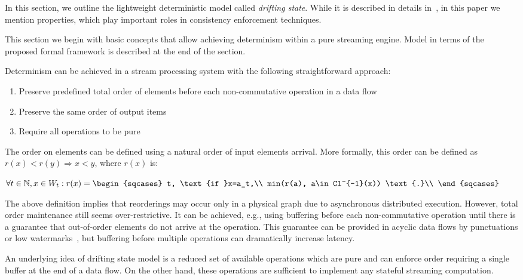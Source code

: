 
\label {fs-model-section}

In this section, we outline the lightweight deterministic model called {\em drifting state}. While it is described in details in~\cite{we2018adbis}, in this paper we mention properties, which play important roles in consistency enforcement techniques.

This section we begin with basic concepts that allow achieving determinism within a pure streaming engine. Model in terms of the proposed formal framework is described at the end of the section.

Determinism can be achieved in a stream processing system with the following straightforward approach:
\begin{enumerate}
    \item Preserve predefined total order of elements before each non-commutative operation in a data flow
    \item Preserve the same order of output items
    \item Require all operations to be pure
\end{enumerate}

The order on elements can be defined using a natural order of input elements arrival. More formally, this order can be defined as $r(x) < r(y) \Rightarrow x < y$, where $r(x)$ is:

$\forall{t\in{\mathbb{N}}, x\in{W_t}} : r(x)=\begin{sqcases}
t, \text{if }x=a_t,\\
min(r(a), a\in Cl^{-1}(x)) \text{.}\\
\end{sqcases}$

The above definition implies that reorderings may occur only in a physical graph due to asynchronous distributed execution. However, total order maintenance still seems over-restrictive. It can be achieved, e.g., using buffering before each non-commutative operation until there is a guarantee that out-of-order elements do not arrive at the operation. This guarantee can be provided in acyclic data flows by punctuations or low watermarks~\cite{Li:2008:OPN:1453856.1453890}, but buffering before multiple operations can dramatically increase latency.

An underlying idea of drifting state model is a reduced set of available operations which are pure and can enforce order requiring a single buffer at the end of a data flow. On the other hand, these operations are sufficient to implement any stateful streaming computation.

